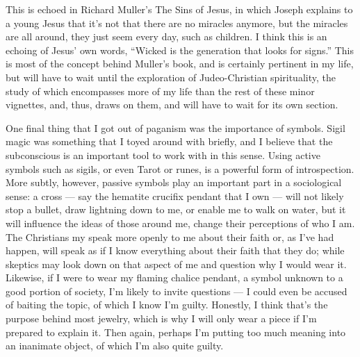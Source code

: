 This is echoed in Richard Muller's The Sins of Jesus, in which Joseph explains to a young Jesus that it's not that there are no miracles anymore, but the miracles are all around, they just seem every day, such as children. I think this is an echoing of Jesus' own words, ``Wicked is the generation that looks for signs.'' This is most of the concept behind Muller's book, and is certainly pertinent in my life, but will have to wait until the exploration of Judeo-Christian spirituality, the study of which encompasses more of my life than the rest of these minor vignettes, and, thus, draws on them, and will have to wait for its own section.

One final thing that I got out of paganism was the importance of symbols. Sigil magic was something that I toyed around with briefly, and I believe that the subconscious is an important tool to work with in this sense. Using active symbols such as sigils, or even Tarot or runes, is a powerful form of introspection. More subtly, however, passive symbols play an important part in a sociological sense: a cross --- say the hematite crucifix pendant that I own --- will not likely stop a bullet, draw lightning down to me, or enable me to walk on water, but it will influence the ideas of those around me, change their perceptions of who I am. The Christians my speak more openly to me about their faith or, as I've had happen, will speak as if I know everything about their faith that they do; while skeptics may look down on that aspect of me and question why I would wear it. Likewise, if I were to wear my flaming chalice pendant, a symbol unknown to a good portion of society, I'm likely to invite questions --- I could even be accused of baiting the topic, of which I know I'm guilty. Honestly, I think that's the purpose behind most jewelry, which is why I will only wear a piece if I'm prepared to explain it. Then again, perhaps I'm putting too much meaning into an inanimate object, of which I'm also quite guilty.
